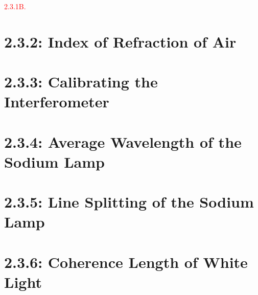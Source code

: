 \documentclass[letterpaper, reqno,11pt]{article}
\begin{document}
\noindent \textcolor{red}{2.3.1B.} 

\section{2.3.2: Index of Refraction of Air}

\section{2.3.3: Calibrating the Interferometer}

\section{2.3.4: Average Wavelength of the Sodium Lamp}

\section{2.3.5: Line Splitting of the Sodium Lamp}

\section{2.3.6: Coherence Length of White Light}
\end{document}

